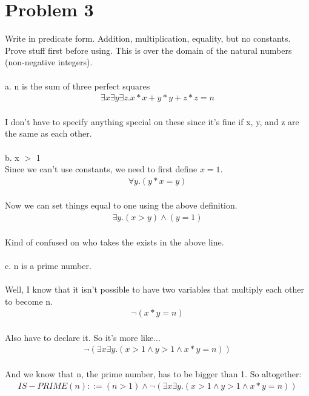 \documentclass{article}
\begin{document}
\section{Problem 3}

Write in predicate form. Addition, multiplication, equality, but no constants. Prove stuff first before using. This is over the domain of the natural numbers (non-negative integers).
\\\\
a. n is the sum of three perfect squares \\
\begin {align*}
\exists x \exists y \exists z. x*x + y*y + z*z = n
\end {align*}
\\
I don't have to specify anything special on these since it's fine if x, y, and z are the same as each other. 
\\\\
b. x $>$ 1
\\
Since we can't use constants, we need to first define $x = 1$. 
\\
\begin {align*}
\forall y. (y*x = y)
\end {align*}
\\
Now we can set things equal to one using the above definition. 
\\
\begin {align*}
\exists y. (x > y) \wedge (y = 1)
\end {align*}
\\
Kind of confused on who takes the exists in the above line. 
\\\\
c. n is a prime number.
\\\\
Well, I know that it isn't possible to have two variables that multiply each other to become n. 
\\
\begin {align*}
\neg(x*y = n)
\end {align*}
\\
Also have to declare it. So it's more like...
\\
\begin {align*}
\neg (\exists x \exists y. (x > 1 \wedge y > 1 \wedge x*y = n))
\end {align*}
\\
And we know that n, the prime number, has to be bigger than 1. So altogether:
\\
\begin {align*}
IS-PRIME(n) ::= (n > 1) \wedge \neg (\exists x \exists y. (x > 1 \wedge y > 1 \wedge x*y = n))
\end {align*}
\end{document}
